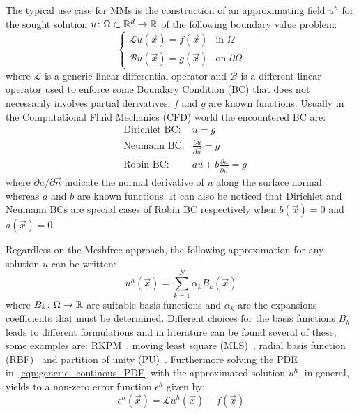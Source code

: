The typical use case for MMs is the construction of an approximating field $u^{h}$ for the sought solution $u\colon\Omega\subset \mathbb{R}^{d}\to\mathbb{R}$ of the following boundary value problem:
\begin{equation}
	\label{eqn:generic_continous_PDE}
	\begin{cases}
		\mathcal{L} u(\vec{x})  = f(\vec{x})		& \text{in $\Omega$} \\
		\mathcal{B} u(\vec{x})   = g(\vec{x})	     & \text{on $\partial\Omega$}
	\end{cases}
\end{equation}
where $\mathcal{L}$ is a generic linear differential operator and $\mathcal{B}$ is a different linear operator used to enforce some Boundary Condition (BC) that does not necessarily involves partial derivatives; $f$ and $g$ are known functions.
Usually in the Computational Fluid Mechanics (CFD) world the encountered BC are:
\begin{align}
	& \text{Dirichlet BC:} & u=g  \\
	& \text{Neumann BC:} & \frac{\partial u}{\partial \vec{n}} = g  \\
	& \text{Robin BC:} & au + b\frac{\partial u}{\partial \vec{n}} = g
\end{align}
where $\partial u / \partial \vec{n}$ indicate the normal derivative of $u$ along the surface normal whereas $a$ and $b$ are known functions. It can also be noticed that Dirichlet and Neumann BCs are special cases of Robin BC respectively when $b(\vec{x})=0$ and $a(\vec{x})=0$.

Regardless on the Meshfree approach, the following approximation for any solution $u$ can be written:
\begin{equation}
	\label{eqn:general_u_discretization}
	u^{h}(\vec{x}) = \sum_{k= 1}^{N} {\alpha_k B_k(\vec{x})}
\end{equation}
where $B_k\colon\Omega\to\mathbb{R}$ are suitable basis functions and $\alpha_k$ are the expansions coefficients that must be determined.
Different choices for the basis functions $B_k$ leads to different formulations and in literature can be found several of these, some examples are: RKPM~\cite{Liu:RKPM}, moving least square (MLS)~\cite{Lancaster:MLS}, radial basis function (RBF)~\cite{Kansa:RBF_1, Kansa:RBF_2} and partition of unity (PU)~\cite{Schweitzer:PU}. Furthermore solving the PDE in~\eqref{eqn:generic_continous_PDE} with the approximated solution $u^h$, in general, yields to a non-zero error function $\epsilon^{h}$ given by:
\begin{equation}
	\epsilon^{h}(\vec{x}) = \mathcal{L} u^{h}(\vec{x}) - f(\vec{x})
\end{equation}

